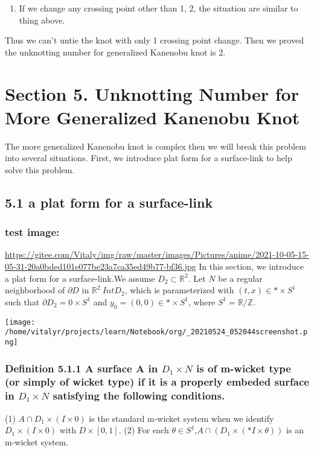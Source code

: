 \documentclass[lang=cn]{elegantpaper}
\begin{document}
\begin{enumerate}
\item If we change any crossing point other than 1, 2, the situation are similar to thing above.
\end{enumerate}

Thus we can't untie the knot with only 1 crossing point change. Then we proved the unknotting number for generalized Kanenobu knot is 2.
\section{Section 5. Unknotting Number for More Generalized Kanenobu Knot}
\label{sec:org76bd4fd}
The more generalized Kanenobu knot is complex then we will break this problem into several situations.
First, we introduce plat form for a surface-link to help solve this problem.
\subsection{5.1 a plat form for a surface-link}
\label{sec:org3726b77}
\subsubsection{test image:}
\label{sec:org1d14dfc}
\url{https://gitee.com/Vitaly/img/raw/master/images/Pictures/anime/2021-10-05-15-05-31-20a0bded101e077be23a7ca35ed49b77-bf36.jpg}
In this section, we introduce a plat form for a surface-link.We assume \(D_{2}\subset \mathbb{R}^{2}\). Let \(N\) be a regular neighborhood of \(\partial D\) in \(\mathbb{R}^{2}\ Int D_{2}\), which is parameterized with \((t, x) \in * \times S^{1}\) such that \(\partial D_{2} ={0} \times S^{1}\) and \(y_{0}=(0,0) \in * \times S^{1}\), where \(S^{1} =\mathbb{R}/\mathbb{Z}\).
\begin{center}
\texttt{[image: /home/vitalyr/projects/learn/Notebook/org/\_20210524\_052044screenshot.png]}
\end{center}
\subsubsection{Definition 5.1.1 A surface A in \(D_{1} \times N\) is of m-wicket type (or simply of wicket type) if it is a properly embeded surface in \(D_{1} \times N\) satisfying the following conditions.}
\label{sec:org92f5658}
(1) \(A \cap D_{1} \times (I \times {0})\) is the standard m-wicket system when we identify \(D_{1} \times (I \times {0})\) with \(D \times [0,1]\).
(2) For each \(\theta \in S^{1}\),\(A \cap (D_{1}\times (*I \times {\theta}))\) is an m-wicket system.
\end{document}
